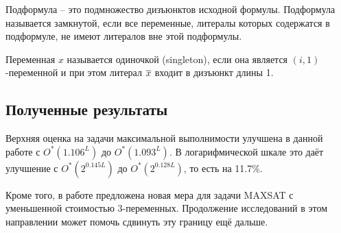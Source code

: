 Подформула -- это подмножество дизъюнктов исходной формулы. Подформула называется замкнутой, если все переменные, литералы которых содержатся в подформуле, не имеют литералов вне этой подформулы.

Переменная $x$ называется одиночкой (singleton), если она является $(i,1)$-переменной и при этом литерал $\overline{x}$ входит в дизъюнкт длины 1.

\subsection*{Полученные результаты}

\firstpar{}Верхняя оценка на задачи максимальной выполнимости улучшена в данной работе с $O^*(1.106^L)$ до $O^*(1.093^L)$. В логарифмической шкале это даёт улучшение с $O^*(2^{0.145L})$ до $O^*(2^{0.128L})$, то есть на 11.7\%.

Кроме того, в работе предложена новая мера для задачи MAXSAT с уменьшенной стоимостью 3-переменных. Продолжение исследований в этом направлении может помочь сдвинуть эту границу ещё дальше.

